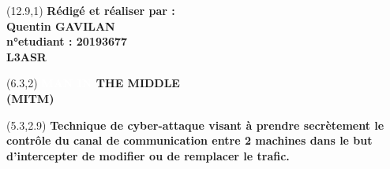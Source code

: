 \documentclass[landscape,12pt]{report}
\begin{document}
  \begin{center}
  \begin{flushright}
  \begin{textblock}{3}(12.9,1)
  \textcolor{black!50}{\textbf{Rédigé et réaliser par :\\ Quentin GAVILAN\\n°etudiant : 20193677\\L3ASR}}
  \end{textblock}
  \end{flushright}
    \begin{textblock}{3}(6.3,2)
        \textbf{
        \huge 
        \textcolor{white}{MAN IN} 
        \textcolor{blue!50}{THE MIDDLE} \\ \Large \textcolor{black!20}{(MITM)}}
    \end{textblock}
  \end{center}
  \begin{flushleft}
  \begin{textblock}{5}(5.3,2.9)
    \textcolor{black!20}{\textbf{\normalsize Technique de
    cyber-attaque visant à prendre secrètement le contrôle du canal de communication entre 2 machines dans le but d'intercepter de modifier ou de remplacer le trafic. }}
  \end{textblock}
  \end{flushleft}
\end{document}
